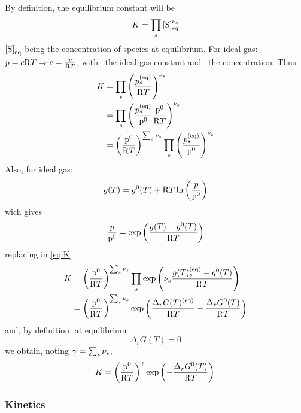 By definition, the equilibrium constant will be
\begin{equation}
K = \prod_s \conc[S]_{\eq}^{\scoef[s]}
\label{eq:Kdef}
\end{equation}
$\conc[S]_{\eq}$ being the concentration of species  at equilibrium.
For ideal gas: $p = \conc\Rg T \Rightarrow \conc = \frac{p}{\Rg T}$, with \Rg\ the ideal
gas constant and \conc\ the concentration. Thus
\begin{equation}
\begin{split}
K & = \prod_s \left(\frac{p^{(\eq)}_s}{\Rg T}\right)^{\scoef[s]} \\
  & = \prod_s \left(\frac{p^{(\eq)}_s}{\pz}\frac{\pz}{\Rg T}\right)^{\scoef[s]} \\
  & = \left(\frac{\pz}{\Rg T}\right)^{\sum_s\scoef[s]} \prod_s \left(\frac{p^{(\eq)}_s}{\pz}\right)^{\scoef[s]} \label{eq:K}
\end{split}
\end{equation}
Also, for ideal gas:
\begin{equation}
g(T) = g^0(T) + \mathrm{R} T \ln\left(\frac{p}{\mathrm{p^0}}\right)
\end{equation}
wich gives
\begin{equation}
\frac{p}{\mathrm{p^0}} = \exp\left(\frac{g(T) - g^0(T)}{\mathrm{R} T}\right)
\end{equation}
replacing in \ref{eq:K}
\begin{equation}
\begin{split}
K & = \left(\frac{\pz}{\Rg T}\right)^{\sum_s\scoef[s]} \prod_s \exp\left(\scoef[s] \frac{g(T)_s^{(\eq)} - g^0(T)}{\Rg T}\right) \\
  & = \left(\frac{\pz}{\Rg T}\right)^{\sum_s\scoef[s]} \exp\left(\frac{\Delta_rG(T)^{(\eq)}}{\Rg T} - \frac{\Delta_rG^0(T)}{\Rg T}\right) \\
\end{split}
\end{equation}
and, by definition, at equilibrium
\begin{equation}
\Delta_rG(T) = 0
\end{equation}
we obtain, noting $\gamma = \sum_s \scoef[s]$,
\begin{equation}
 K = \left(\frac{\mathrm{p^0}}{\mathrm{R} T}\right)^\gamma \exp\left(-\frac{\Delta_rG^0(T)}{\mathrm{R} T}\right) \\
\end{equation}

\subsubsection{Kinetics}
\label{demo-eqrate}

